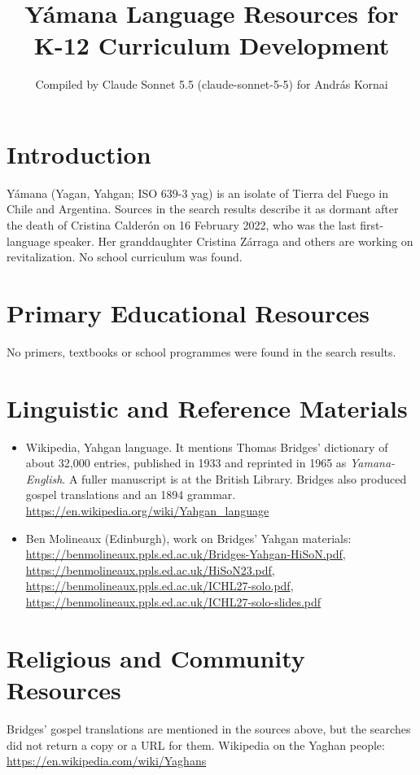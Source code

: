 \documentclass[12pt]{article}
\title{Y\'amana Language Resources for K-12 Curriculum Development}
\author{Compiled by Claude Sonnet 5.5 (claude-sonnet-5-5) for Andr\'as Kornai}
\date{}
\begin{document}
\maketitle

\section{Introduction}
Y\'amana (Yagan, Yahgan; ISO 639-3 yag) is an isolate of Tierra del Fuego in Chile and Argentina. Sources in the search results describe it as dormant after the death of Cristina Calder\'on on 16 February 2022, who was the last first-language speaker. Her granddaughter Cristina Z\'arraga and others are working on revitalization. No school curriculum was found.

\section{Primary Educational Resources}
No primers, textbooks or school programmes were found in the search results.

\section{Linguistic and Reference Materials}
\begin{itemize}
\item Wikipedia, Yahgan language. It mentions Thomas Bridges' dictionary of about 32,000 entries, published in 1933 and reprinted in 1965 as \emph{Yamana-English}. A fuller manuscript is at the British Library. Bridges also produced gospel translations and an 1894 grammar. \url{https://en.wikipedia.org/wiki/Yahgan_language}
\item Ben Molineaux (Edinburgh), work on Bridges' Yahgan materials: \url{https://benmolineaux.ppls.ed.ac.uk/Bridges-Yahgan-HiSoN.pdf}, \url{https://benmolineaux.ppls.ed.ac.uk/HiSoN23.pdf}, \url{https://benmolineaux.ppls.ed.ac.uk/ICHL27-solo.pdf}, \url{https://benmolineaux.ppls.ed.ac.uk/ICHL27-solo-slides.pdf}
\end{itemize}

\section{Religious and Community Resources}
Bridges' gospel translations are mentioned in the sources above, but the searches did not return a copy or a URL for them. Wikipedia on the Yaghan people: \url{https://en.wikipedia.com/wiki/Yaghans}
\end{document}
